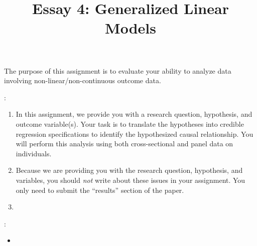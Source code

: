 \documentclass[a4paper,11pt]{article}
\title{Essay 4: Generalized Linear Models}
\author{}
\date{}
\begin{document}
\maketitle

\vspace{-3em}


\vspace{1em}

\noindent The purpose of this assignment is to evaluate your ability to analyze data involving non-linear/non-continuous outcome data.

\vspace{1em}

:
\begin{enumerate}\itemsep1em
\item In this assignment, we provide you with a research question, hypothesis, and outcome variable(s). Your task is to translate the hypotheses into credible regression specifications to identify the hypothesized causal relationship. You will perform this analysis using both cross-sectional and panel data on individuals. 

\item Because we are providing you with the research question, hypothesis, and variables, you should \textit{not} write about these issues in your assignment. You only need to submit the ``results'' section of the paper.

\item 









\end{enumerate}

\vspace{1em}

:
\begin{itemize}
\item 
\end{itemize}
\end{document}
